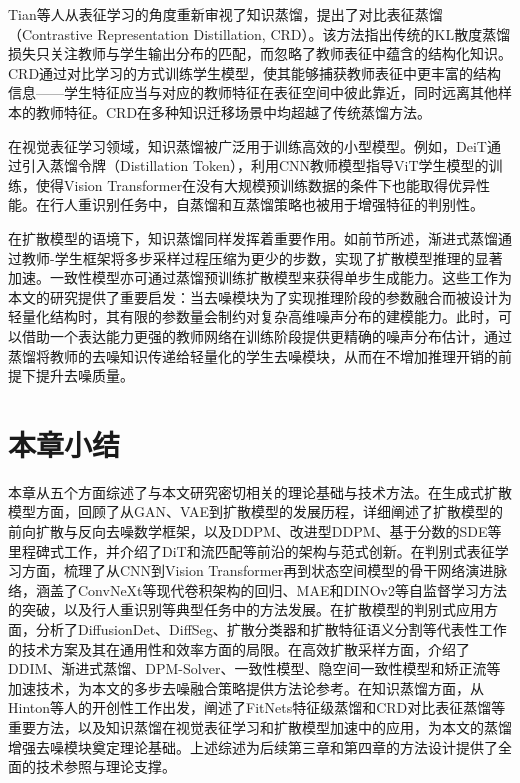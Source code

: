 Tian等人\cite{tian2020contrastive}从表征学习的角度重新审视了知识蒸馏，提出了对比表征蒸馏（Contrastive Representation Distillation, CRD）。该方法指出传统的KL散度蒸馏损失只关注教师与学生输出分布的匹配，而忽略了教师表征中蕴含的结构化知识。CRD通过对比学习的方式训练学生模型，使其能够捕获教师表征中更丰富的结构信息——学生特征应当与对应的教师特征在表征空间中彼此靠近，同时远离其他样本的教师特征。CRD在多种知识迁移场景中均超越了传统蒸馏方法。

在视觉表征学习领域，知识蒸馏被广泛用于训练高效的小型模型。例如，DeiT\cite{touvron2021training}通过引入蒸馏令牌（Distillation Token），利用CNN教师模型指导ViT学生模型的训练，使得Vision Transformer在没有大规模预训练数据的条件下也能取得优异性能。在行人重识别任务中，自蒸馏和互蒸馏策略也被用于增强特征的判别性\cite{luo2021self}。

在扩散模型的语境下，知识蒸馏同样发挥着重要作用。如前节所述，渐进式蒸馏\cite{salimans2022progressive}通过教师-学生框架将多步采样过程压缩为更少的步数，实现了扩散模型推理的显著加速。一致性模型\cite{song2023consistency}亦可通过蒸馏预训练扩散模型来获得单步生成能力。这些工作为本文的研究提供了重要启发：当去噪模块为了实现推理阶段的参数融合而被设计为轻量化结构时，其有限的参数量会制约对复杂高维噪声分布的建模能力。此时，可以借助一个表达能力更强的教师网络在训练阶段提供更精确的噪声分布估计，通过蒸馏将教师的去噪知识传递给轻量化的学生去噪模块，从而在不增加推理开销的前提下提升去噪质量。

\section{本章小结}

本章从五个方面综述了与本文研究密切相关的理论基础与技术方法。在生成式扩散模型方面，回顾了从GAN、VAE到扩散模型的发展历程，详细阐述了扩散模型的前向扩散与反向去噪数学框架，以及DDPM、改进型DDPM、基于分数的SDE等里程碑式工作，并介绍了DiT和流匹配等前沿的架构与范式创新。在判别式表征学习方面，梳理了从CNN到Vision Transformer再到状态空间模型的骨干网络演进脉络，涵盖了ConvNeXt等现代卷积架构的回归、MAE和DINOv2等自监督学习方法的突破，以及行人重识别等典型任务中的方法发展。在扩散模型的判别式应用方面，分析了DiffusionDet、DiffSeg、扩散分类器和扩散特征语义分割等代表性工作的技术方案及其在通用性和效率方面的局限。在高效扩散采样方面，介绍了DDIM、渐进式蒸馏、DPM-Solver、一致性模型、隐空间一致性模型和矫正流等加速技术，为本文的多步去噪融合策略提供方法论参考。在知识蒸馏方面，从Hinton等人的开创性工作出发，阐述了FitNets特征级蒸馏和CRD对比表征蒸馏等重要方法，以及知识蒸馏在视觉表征学习和扩散模型加速中的应用，为本文的蒸馏增强去噪模块奠定理论基础。上述综述为后续第三章和第四章的方法设计提供了全面的技术参照与理论支撑。